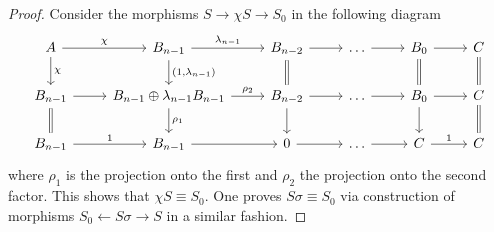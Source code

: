 \begin{proof}
Consider the morphisms $S \to \chi S \to S_0$ in the following diagram
\begin{equation*}
\begin{tikzcd}
A \arrow{r}{\chi} \arrow{d}{\chi} &
B_{n-1} \arrow{r}{\lambda_{n-1}}\arrow{d}{(1,\lambda_{n-1})} &
B_{n-2} \arrow{r}\arrow[d,equal] &
\dots \arrow{r} & 
B_0 \arrow{r} \arrow[d,equal]& 
C  \arrow[d,equal]
\\ 
B_{n-1} \arrow{r} \arrow[d, equal] &
B_{n-1} \oplus \lambda_{n-1} B_{n-1} \arrow{r}{\rho_2}\arrow{d}{\rho_1} &
B_{n-2} \arrow{r}\arrow{d} &
\dots \arrow{r} & 
B_0 \arrow{r} \arrow{d}& 
C  \arrow[d,equal]
\\
B_{n-1} \arrow{r}{1} & 
B_{n-1} \arrow{r} & 
0 \arrow{r} &
\dots \arrow{r} &
C \arrow{r}{1} & 
C 
\end{tikzcd}
\end{equation*}
where $\rho_1$ is the projection onto the first and $\rho_2$ the projection onto the second factor.
This shows that $\chi S \equiv S_0$.
One proves $S\sigma \equiv S_0$ via construction of morphisms $S_0 \leftarrow S\sigma \to S$ in a similar fashion.
\end{proof}


